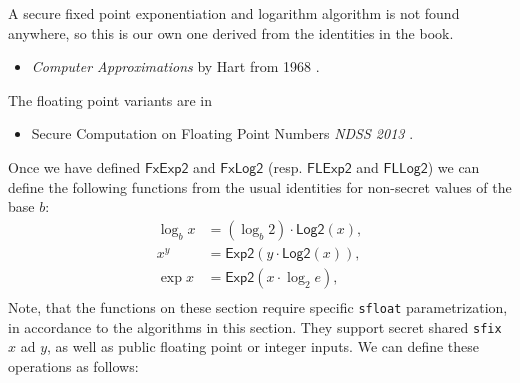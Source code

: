 

  A secure fixed point exponentiation and logarithm algorithm is not found anywhere, so
  this is our own one derived from the identities in the book.
  \begin{itemize}
    \item {\em Computer Approximations} by Hart from 1968 \cite{Hart:1978:CA:540084}.
  \end{itemize}
  The floating point variants are in
  \begin{itemize}
    \item Secure Computation on Floating Point Numbers {\em NDSS 2013} \cite{ABZS13}.
  \end{itemize}
  Once we have defined $$ and $$
  (resp. $$ and $$) we can
  define the following functions from the usual identities
  for non-secret values of the base $b$:
  \begin{align*}
    \log_b x & = (\log_b 2) \cdot \mathsf{Log2}(x),       \\
    x^y      & = \mathsf{Exp2}(y \cdot \mathsf{Log2}(x)), \\
    \exp   x & = \mathsf{Exp2}(x \cdot \log_2 e),         \\
  \end{align*}
  Note, that the functions on these section require specific \verb|sfloat| parametrization, in accordance to the algorithms in this section. They support secret shared \verb|sfix| $x$ ad $y$, as well as public floating point or integer inputs.  We can define these operations as follows:

